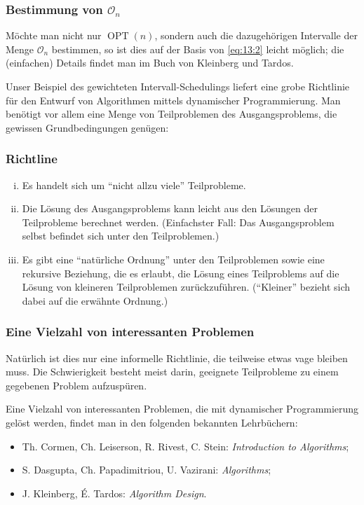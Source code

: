\documentclass[smaller]{beamer}
\renewcommand{\O}{\mathcal{O}}
\DeclareMathOperator{\opt}{OPT}
\begin{document}
\begin{frame}
 \frametitle{Bestimmung von $\O_n$}
 Möchte man nicht nur $\opt{(n)}$, sondern auch die dazugehörigen Intervalle der Menge $\O_n$ bestimmen, so ist dies auf der Basis von \eqref{eq:13:2} leicht möglich; die (einfachen) Details findet man im Buch von Kleinberg und Tardos. \\ \medskip

Unser Beispiel des gewichteten Intervall-Schedulings liefert eine \alert{grobe Richtlinie} für den Entwurf von Algorithmen mittels dynamischer Programmierung. Man benötigt vor allem eine \alert{Menge von Teilproblemen} des Ausgangsproblems, die gewissen Grundbedingungen genügen:  
\end{frame}

\begin{frame}
 \frametitle{Richtline}
 \begin{enumerate}[i)]
\item Es handelt sich um \alert{\enquote{nicht allzu viele} Teilprobleme.}
\item \alert{Die Lösung des Ausgangsproblems kann leicht aus den Lösungen der Teilprobleme berechnet werden.} (Einfachster Fall: Das Ausgangsproblem selbst befindet sich unter den Teilproblemen.)
\item \alert{Es gibt eine \enquote{natürliche Ordnung} unter den Teilproblemen sowie eine rekursive Beziehung}, die es erlaubt, die Lösung eines Teilproblems auf die Lösung von kleineren Teilproblemen zurückzuführen. (\enquote{Kleiner} bezieht sich dabei auf die erwähnte Ordnung.)
\end{enumerate}
\end{frame}

\begin{frame}
 \frametitle{Eine Vielzahl von interessanten Problemen}
 Natürlich ist dies nur eine informelle Richtlinie, die teilweise etwas vage bleiben muss. \alert{Die Schwierigkeit besteht meist darin, geeignete Teilprobleme zu einem gegebenen Problem aufzuspüren}. \\ \medskip

Eine Vielzahl von interessanten Problemen, die mit dynamischer Programmierung gelöst werden, findet man in den folgenden bekannten Lehrbüchern:
\begin{itemize}
\item Th. Cormen, Ch. Leiserson, R. Rivest, C. Stein: \textit{Introduction to Algorithms};
\item S. Dasgupta, Ch. Papadimitriou, U. Vazirani: \textit{Algorithms};
\item J. Kleinberg, É. Tardos: \textit{Algorithm Design}.
\end{itemize}
\end{frame}
\end{document}
